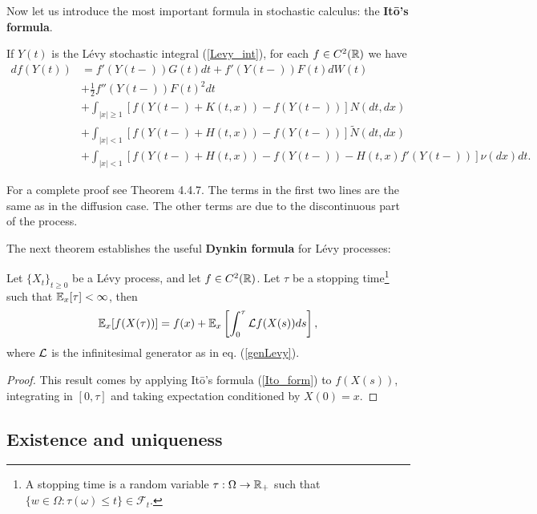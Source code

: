 Now let us introduce the most important formula in stochastic calculus: the \textbf{It\={o}'s formula}.
\begin{Theorem}
If $Y(t)$ is the Lévy stochastic integral (\ref{Levy_int}), for each $f \in C^2(\mathbb{R})$ we have  
\begin{align} \label{Ito_form}
 df(Y(t)) &= f'(Y(t-))G(t) dt  + f'(Y(t-))F(t) dW(t) \\ \nonumber
          &+ \frac{1}{2} f''(Y(t-))F(t)^2 dt \\ \nonumber 
          &+ \int_{|x|\geq 1} [f(Y(t-)+ K(t,x)) - f(Y(t-)) ] N(dt,dx) \\ \nonumber
          &+ \int_{|x|< 1} [f(Y(t-)+ H(t,x)) - f(Y(t-)) ] \tilde N(dt,dx) \\ \nonumber  
          &+ \int_{|x|< 1} [f(Y(t-)+ H(t,x)) - f(Y(t-)) - H(t,x)f'(Y(t-))] \nu(dx)dt. \nonumber
\end{align}
\end{Theorem}
For a complete proof see \cite{Applebaum} Theorem 4.4.7.
The terms in the first two lines are the same as in
the diffusion case. The other terms are due to the discontinuous part of the process.

The next theorem establishes the useful \textbf{Dynkin formula} for Lévy processes:
\begin{Theorem}
 Let $\{X_t\}_{t \ge 0}$ be a Lévy process, and let $f\in C^2(\mathbb{R})$. Let $\tau$ be a stopping time\footnote{A stopping time is a random
 variable $\tau : \Omega \to \mathbb{R}_+$ such that $\{w\in\Omega : \tau(\omega) \leq t\} \in \mathcal{F}_t$.} such that
 $\mathbb{E}_x[\tau] < \infty$, then
 \begin{equation}\label{Dynkin_formula}
  \mathbb{E}_x[f(X(\tau))] = f(x) +\mathbb{E}_x\left[ \int_0^{\tau} \mathcal{L} f(X(s))ds \right],
 \end{equation}
 where $\mathcal{L}$ is the infinitesimal generator as in eq. (\ref{genLevy}).
\end{Theorem}
\begin{proof}
 This result comes by applying It\={o}'s formula (\ref{Ito_form}) to $f(X(s))$, integrating in $[0,\tau]$ and taking 
 expectation conditioned by $X(0)=x$.
\end{proof}

\subsection{Existence and uniqueness}\label{existence_uniqueness}

